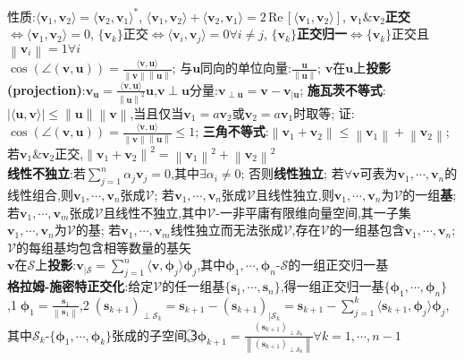\documentclass[UTF8,a4paper,10pt]{article}
\providecommand{\abs}[1]{\left\lvert#1\right\rvert}
\providecommand{\norm}[1]{\left\lVert#1\right\rVert}
\providecommand{\re}{\,\mathrm{Re}\,}
\begin{document}
\begin{multicols*}{2}
    性质:$\langle\bm{v}_1,\bm{v}_2\rangle=\langle\bm{v}_2,\bm{v}_1\rangle^*$,%
    $\langle\bm{v}_1,\bm{v}_2\rangle+\langle\bm{v}_2,\bm{v}_1\rangle=2\re[\langle\bm{v}_1,\bm{v}_2\rangle]$,%
    $\bm{v}_1$\&$\bm{v}_2$\textbf{正交}$\Leftrightarrow\langle\bm{v}_1,\bm{v}_2\rangle=0$,%
    $\{\bm{v}_k\}$正交$\Leftrightarrow\langle\bm{v}_i,\bm{v}_j\rangle=0\forall i\neq j$,%
    $\{\bm{v}_k\}$\textbf{正交归一}$\Leftrightarrow\{\bm{v}_k\}$正交且$\norm{\bm{v}_i}=1\forall i$\\
$\cos(\angle(\bm{v},\bm{u}))=\frac{\langle\bm{v},\bm{u}\rangle}{\norm{\bm{v}}\norm{\bm{u}}}$;%
    与$\bm{u}$同向的单位向量:$\frac{\bm{u}}{\norm{\bm{u}}}$;%
    $\bm{v}$在$\bm{u}$上\textbf{投影(projection)}:$\bm{v}_{\bm{u}}=\frac{\langle\bm{v},\bm{u}\rangle}{\norm{\bm{u}}^2}\bm{u}$,$\bm{v}\perp\bm{u}$分量:$\bm{v}_{\perp\bm{u}}=\bm{v}-\bm{v}_{\vert\bm{u}}$;%
    \textbf{施瓦茨不等式}:$\abs{\langle\bm{u},\bm{v}\rangle}\leq\norm{\bm{u}}\norm{\bm{v}}$,当且仅当$\bm{v}_1=a\bm{v}_2$或$\bm{v}_2=a\bm{v}_1$时取等;%
    证:$\cos(\angle(\bm{v},\bm{u}))=\frac{\langle\bm{v},\bm{u}\rangle}{\norm{\bm{v}}\norm{\bm{u}}}\leq 1$;%
    \textbf{三角不等式}:$\norm{\bm{v}_1+\bm{v}_2}\leq\norm{\bm{v}_1}+\norm{\bm{v}_2}$;
    若$\bm{v}_1$\&$\bm{v}_2$正交,$\norm{\bm{v}_1+\bm{v}_2}^2=\norm{\bm{v}_1}^2+\norm{\bm{v}_2}^2$\\
\textbf{线性不独立}:若$\sum_{j=1}^n\alpha_j\bm{v}_j=0$,其中$\exists\alpha_i\neq 0$;%
    否则\textbf{线性独立};%
    若$\forall\bm{v}$可表为$\bm{v}_1,\cdots,\bm{v}_n$的线性组合,则$\bm{v}_1,\cdots,\bm{v}_n$张成$\mathcal{V}$;%
    若$\bm{v}_1,\cdots,\bm{v}_n$张成$\mathcal{V}$且线性独立,则$\bm{v}_1,\cdots,\bm{v}_n$为$\mathcal{V}$的一组\textbf{基};%
    若$\bm{v}_1,\cdots,\bm{v}_m$张成$\mathcal{V}$且线性不独立,其中$\mathcal{V}$-一非平庸有限维向量空间,其一子集$\bm{v}_1,\cdots,\bm{v}_n$为$\mathcal{V}$的基;%
    若$\bm{v}_1,\cdots,\bm{v}_m$线性独立而无法张成$\mathcal{V}$,存在$\mathcal{V}$的一组基包含$\bm{v}_1,\cdots,\bm{v}_n$;%
    $\mathcal{V}$的每组基均包含相等数量的基矢\\
$\bm{v}$在$\mathcal{S}$上\textbf{投影}:$\bm{v}_{\vert\mathcal{S}}=\sum_{j=1}^n\langle\bm{v},\bm{\phi}_j\rangle\bm{\phi}_j$,其中$\bm{\phi}_1,\cdots,\bm{\phi}_n$-$\mathcal{S}$的一组正交归一基\\
\textbf{格拉姆-施密特正交化}:给定$\mathcal{V}$的任一组基$\{\bm{s}_1,\cdots,\bm{s}_n\}$,得一组正交归一基$\{\bm{\phi}_1,\cdots,\bm{\phi}_n\}$,\textcircled{1}$\bm{\phi}_1=\frac{\bm{s}_1}{\norm{\bm{s}_1}}$,\textcircled{2}$(\bm{s}_{k+1})_{\perp\mathcal{S}_k}=\bm{s}_{k+1}-(\bm{s}_{k+1})_{\vert\mathcal{S}_k}=\bm{s}_{k+1}-\sum_{j=1}^k\langle\bm{s}_{k+1},\bm{\phi}_j\rangle\bm{\phi}_j$,其中$\mathcal{S}_k$-$\{\bm{\phi}_1,\cdots,\bm{\phi}_k\}$张成的子空间,\textcircled{3}$\bm{\phi}_{k+1}=\frac{(\bm{s}_{k+1})_{\perp\mathcal{S}_k}}{\norm{(\bm{s}_{k+1})_{\perp\mathcal{S}_k}}}\forall k=1,\cdots,n-1$\\

\end{multicols*}
\end{document}
